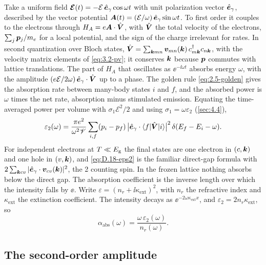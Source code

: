 Take a uniform field $\bm{\mathcal{E}}(t) = -\mathcal{E}\,\hat{\bm{e}}_\gamma\cos\omega t$ with unit polarization vector $\hat{\bm{e}}_\gamma$, described by the vector potential $\bm{A}(t) = (\mathcal{E}/\omega)\,\hat{\bm{e}}_\gamma\sin\omega t$. To first order it couples to the electrons through $H_A = e\bm{A}\cdot\hat{\bm{V}}$, with $\hat{\bm{V}}$ the total velocity of the electrons, $\sum_j\bm{p}_j/m_e$ for a local potential, and the sign of the charge irrelevant for rates. In second quantization over Bloch states, $\hat{\bm{V}} = \sum_{\bm{k}mn}\bm{v}_{mn}(\bm{k})\,c^\dagger_{m\bm{k}}c_{n\bm{k}}$, with the velocity matrix elements of \cref{eq:3.2-pv}; it conserves $\bm{k}$ because $\bm{p}$ commutes with lattice translations. The part of $H_A$ that oscillates as $\ee^{-\ii\omega t}$ absorbs energy $\omega$, with the amplitude $(e\mathcal{E}/2\omega)\,\hat{\bm{e}}_\gamma\cdot\hat{\bm{V}}$ up to a phase. The golden rule \cref{eq:2.5-golden} gives the absorption rate between many-body states $i$ and $f$, and the absorbed power is $\omega$ times the net rate, absorption minus stimulated emission. Equating the time-averaged power per volume with $\sigma_1\mathcal{E}^2/2$ and using $\sigma_1 = \omega\varepsilon_2$ (\cref{sec:4.4}),
\begin{equation}
  \varepsilon_2(\omega) = \frac{\pi e^2}{\omega^2\mathscr{V}}\sum_{i,f}(p_i - p_f)\,\bigl|\hat{\bm{e}}_\gamma\cdot\langle f|\hat{\bm{V}}|i\rangle\bigr|^2\,\delta(E_f - E_i - \omega) .
  \label{eq:D.18-eps2}
\end{equation}
For independent electrons at $T \ll E_{\mathrm{g}}$ the final states are one electron in $(c,\bm{k})$ and one hole in $(v,\bm{k})$, and \cref{eq:D.18-eps2} is the familiar direct-gap formula with $2\sum_{\bm{k}cv}|\hat{\bm{e}}_\gamma\cdot\bm{v}_{cv}(\bm{k})|^2$, the 2 counting spin. In the frozen lattice nothing absorbs below the direct gap. The absorption coefficient is the inverse length over which the intensity falls by $\ee$. Write $\varepsilon = (n_r + \ii\kappa_{\mathrm{ext}})^2$, with $n_r$ the refractive index and $\kappa_{\mathrm{ext}}$ the extinction coefficient. The intensity decays as $\ee^{-2\omega\kappa_{\mathrm{ext}}x}$, and $\varepsilon_2 = 2n_r\kappa_{\mathrm{ext}}$, so
\begin{equation}
  \alpha_{\mathrm{abs}}(\omega) = \frac{\omega\,\varepsilon_2(\omega)}{n_r(\omega)} .
  \label{eq:D.18-alpha}
\end{equation}

\subsection*{The second-order amplitude}

